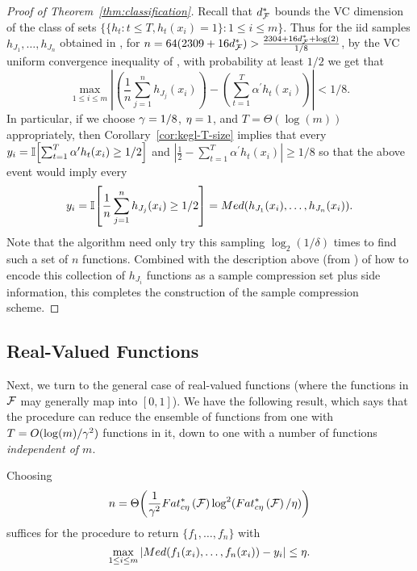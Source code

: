 \documentclass[12pt,a4paper,oneside,onecolumn]{book}
\begin{document}
\begin{proof}[Proof of Theorem~\ref{thm:classification}]
Recall that $d^*_{\mathcal{F}}$ bounds the VC dimension of the class of sets $\{ \{ h_{t} : t \leq T, h_{t}(x_i) = 1 \} : 1 \leq i \leq m \}$.
Thus for the iid samples $h_{J_{1}},\ldots,h_{J_{n}}$ obtained in , 
for $n = 64(2309 + 16d^*_{\mathcal{F}}) > \frac{2304 + 16d^*_{\mathcal{F}}+\log(2)}{1/8}$, 
by the
VC
uniform convergence inequality of 
\citet{MR0288823}, 
with probability at least $1/2$ 
we get that
\begin{equation*}
  \max_{1 \leq i \leq m} \left| \left( \frac{1}{n} \sum_{j=1}^{n} h_{J_{j}}(x_i) \right)  - \left( \sum_{t=1}^{T} \alpha^{\prime} h_{t}(x_i) \right) \right| < 1/8.
\end{equation*}
In particular, if we choose $\gamma = 1/8$, $\eta = 1$, and $T = \Theta(\log(m))$ appropriately, 
then Corollary~\ref{cor:kegl-T-size} implies that 
every $y_i = \mathbb{I}\!\left[ \sum_{t=1}^{T} \alpha^{\prime} h_{t}(x_i) \geq 1/2 \right]$ 
and $\left| \frac{1}{2} - \sum_{t=1}^{T} \alpha^{\prime} h_{t}(x_i) \right| \geq 1/8$ 
so that the above event would imply 
every 
$$y_i = \mathbb{I}\!\left[ \frac{1}{n} \sum_{j=1}^{n} h_{J_{j}}(x_i) \geq 1/2 \right] = Med(h_{J_{1}}(x_i),\ldots,h_{J_{n}}(x_i)).$$
Note that the  algorithm need only try this sampling $\log_{2}(1/\delta)$ times to find such a set of $n$ functions.
Combined with the description above (from \citealp{moran2016sample}) 
of how to encode this collection of $h_{J_{i}}$ functions as a sample compression set plus side information, 
this completes the construction of the sample compression scheme.
\end{proof}


    


\subsection{Real-Valued Functions}


\label{subsubsec:real-valued-compression}


Next, we turn to the general case of real-valued functions (where the functions in $\mathcal{F}$ may generally map into $[0,1]$).
We have the following result, which says that the  procedure can reduce the ensemble of functions 
from one with $T=O(\log(m)/\gamma^2)$ functions in it, down to one with a number of functions \emph{independent of $m$}.

\begin{theorem}
\label{thm:real-sparsification}
Choosing $$n = \Theta\!\left( \frac{1}{\gamma^{2}} Fat^*_{c\eta}\left(\mathcal{F}\right) \log^{2}( Fat^*_{c\eta}\left(\mathcal{F}\right)/\eta ) \right)$$ 
suffices for the  procedure to return $\{f_{1},\ldots,f_{n}\}$ 
with $$\max_{1 \leq i \leq m} | Med(f_{1}(x_{i}),\ldots,f_{n}(x_{i})) - y_{i} | \leq \eta.$$
\end{theorem}
\end{document}
